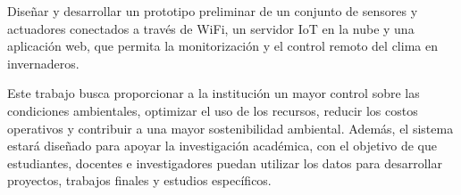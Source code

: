 Diseñar y desarrollar un prototipo preliminar de un conjunto de sensores y actuadores conectados a través de WiFi, un servidor IoT en la nube y
una aplicación web, que permita la monitorización y el control remoto del clima en invernaderos. 

Este trabajo busca proporcionar a la institución un mayor control sobre las condiciones ambientales, optimizar el uso de los recursos, reducir los costos 
operativos y contribuir a una mayor sostenibilidad ambiental. Además, el sistema estará diseñado para apoyar la investigación académica, con el objetivo 
de que estudiantes, docentes e investigadores puedan utilizar los datos para desarrollar proyectos, trabajos finales y estudios específicos.
